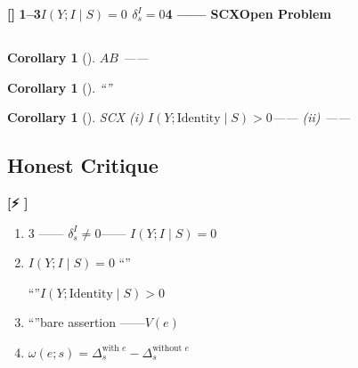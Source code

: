 \documentclass[11pt,a4paper]{article}
\newtheorem{corollary}[theorem]{Corollary}
\theoremstyle{remark}
\newcommand{\rigorous}{\textnormal{\textbf{[]}}}
\newcommand{\honestwarning}{\textnormal{\textbf{[⚡ ]}}}
\begin{document}
\rigorous{} \textbf{1--3$I(Y; I \mid S) = 0$
$\delta_s^{I} = 0$4
——
SCX\textbf{Open Problem}\textbf{}
}

\subsection{}

\begin{corollary}[]
\label{cor:substitutability}
$A$$B$
——

\end{corollary}

\begin{corollary}[]
\label{cor:expert}
``''


\end{corollary}

\begin{corollary}[]
\label{cor:discrimination}
SCX
(i) $I(Y; \text{Identity} \mid S) > 0$——
 (ii) \textbf{}——

\end{corollary}

\subsection{Honest Critique}

\honestwarning{} \textbf{}

\begin{enumerate}[label=(\arabic*)]
    \item \textbf{}3
          ——
          \textbf{}\textbf{}
          $\delta_s^{I} \neq 0$——
          $I(Y; I \mid S) = 0$\textbf{
          }
          

    \item \textbf{}$I(Y; I \mid S) = 0$
          ``''
          
          ``''$I(Y; \text{Identity} \mid S) > 0$
          \textbf{}\textbf{}
          

    \item \textbf{}
          ``''bare assertion
          ——$V(e)$
          

    \item \textbf{}$\omega(e; s) = \Delta_s^{\text{with } e}
          - \Delta_s^{\text{without } e}$
          
          
\end{enumerate}

\end{document}
